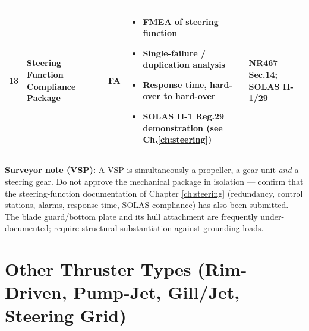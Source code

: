 \documentclass[11pt,a4paper]{report}
\newcommand{\fa}{\textbf{\textcolor{warningred}{FA}}}
\begin{document}
\begin{longtable}{|p{0.5cm}|p{5cm}|p{1.5cm}|p{5.5cm}|p{2cm}|}
13 & Steering Function Compliance Package & \fa{} &
\begin{itemize}[leftmargin=*,nosep]
\item FMEA of steering function
\item Single-failure / duplication analysis
\item Response time, hard-over to hard-over
\item SOLAS II-1 Reg.29 demonstration (see Ch.\ref{ch:steering})
\end{itemize} & NR467 Sec.14; SOLAS II-1/29 \\
\hline

\end{longtable}

\noindent\textbf{Surveyor note (VSP):} A VSP is simultaneously a propeller, a
gear unit \emph{and} a steering gear. Do not approve the mechanical package in
isolation --- confirm that the steering-function documentation of
Chapter \ref{ch:steering} (redundancy, control stations, alarms, response time,
SOLAS compliance) has also been submitted. The blade guard/bottom plate and its
hull attachment are frequently under-documented; require structural
substantiation against grounding loads.

\newpage

\chapter{Other Thruster Types (Rim-Driven, Pump-Jet, Gill/Jet, Steering Grid)}

\noindent{}
\label{ch:othertypes}
\end{document}
